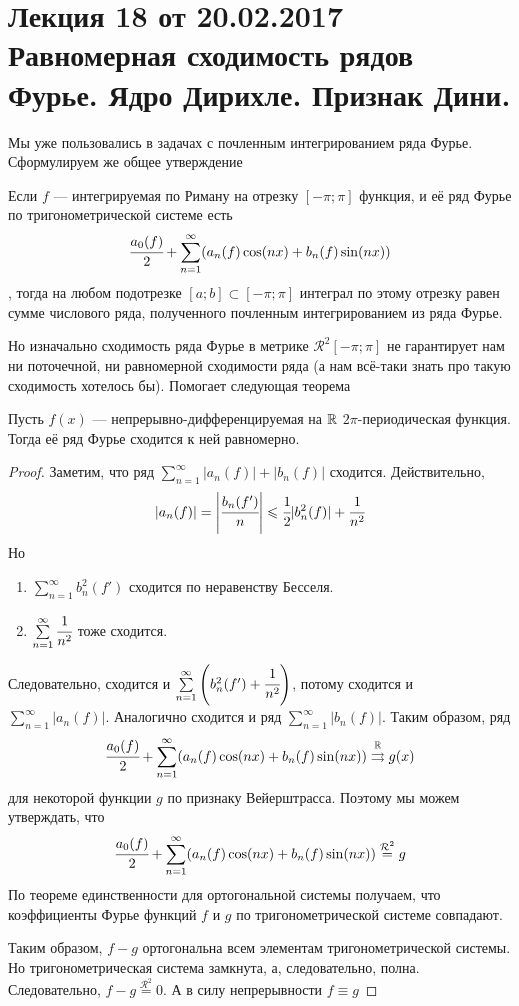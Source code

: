 \documentclass[a4paper, 12pt]{article}
\begin{document}
\newcommand{\y}{\hat{y}}
\newcommand{\lmao}{неотрицательная непрерывная $2\pi$-периодическая аппроксимативная единица}
\pagestyle{fancy}
\section{Лекция 18 от 20.02.2017 \\ Равномерная сходимость рядов Фурье. Ядро Дирихле. Признак Дини.}
Мы уже пользовались в задачах с почленным интегрированием ряда Фурье. Сформулируем же общее утверждение
\begin{Statement}
	Если $f$ --- интегрируемая по Риману на отрезку $[-\pi;\pi]$  функция, и её ряд Фурье по тригонометрической системе есть
	$$
		\cfrac{a_0(f)}{2} + \sum\limits_{n=1}^{\infty}(a_n(f)\cos(nx) + b_n(f)\sin(nx))
	$$
	, тогда на любом подотрезке $[a;b] \subset [-\pi; \pi]$ интеграл по этому отрезку равен сумме числового ряда, полученного почленным интегрированием из ряда Фурье.
\end{Statement}
Но изначально сходимость ряда Фурье в метрике $\mathcal{R}^2[-\pi; \pi]$ не гарантирует нам ни поточечной, ни равномерной сходимости ряда (а нам всё-таки знать про такую сходимость хотелось бы). Помогает следующая теорема
\begin{Theorem}
	Пусть $f(x)$ --- непрерывно-дифференцируемая на $\mathbb{R}$ $2\pi$-периодическая функция. Тогда её ряд Фурье сходится к ней равномерно.
\end{Theorem}
\begin{proof}
	Заметим, что ряд $\sum\limits_{n=1}^{\infty} |a_n(f)| + |b_n(f)|$ сходится. Действительно,
	$$
		|a_n(f)| = \left|\cfrac{b_n(f')}{n}\right| \leqslant \cfrac{1}{2} |b_n^2(f)| + \cfrac{1}{n^2}
	$$
	Но
	\begin{enumerate}
		\item $\sum\limits_{n=1}^{\infty} b_n^2(f')$ сходится по неравенству Бесселя.
		\item $\sum\limits_{n=1}^{\infty} \cfrac{1}{n^2}$ тоже сходится.
	\end{enumerate}
	Следовательно, сходится и $\sum\limits_{n=1}^{\infty}\left(b_n^2(f') + \cfrac{1}{n^2}\right)$, потому сходится и $\sum \limits_{n=1}^{\infty}|a_n(f)|$. Аналогично сходится и ряд $\sum \limits_{n=1}^{\infty}|b_n(f)|$. Таким образом, ряд 
	$$
		\cfrac{a_0(f)}{2} + \sum\limits_{n=1}^{\infty}(a_n(f)\cos(nx)+ b_n(f)\sin(nx)) \overset{\mathbb{R}}{\rightrightarrows} g(x)
	$$
	для некоторой функции $g$ по признаку Вейерштрасса. Поэтому мы можем утверждать, что
	$$
		\cfrac{a_0(f)}{2} + \sum\limits_{n=1}^{\infty}(a_n(f)\cos(nx)+ b_n(f)\sin(nx)) \overset{\mathcal{R}^2}{=} g
	$$
	По теореме единственности для ортогональной системы получаем, что коэффициенты Фурье функций $f$ и $g$ по тригонометрической системе совпадают.
	\par Таким образом, $f-g$ ортогональна всем элементам тригонометрической системы. Но тригонометрическая система замкнута, а, следовательно, полна. Следовательно, $f-g \overset{\mathcal{R}^2}{=} 0$. А в силу непрерывности $f \equiv g$
\end{proof}
\end{document}
